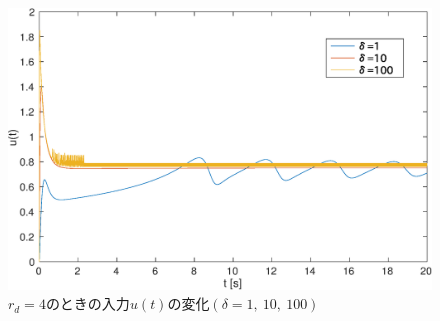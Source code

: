 \documentclass[a4paper,12pt]{jarticle}
\begin{document}
\begin{figure}[H]
 \begin{center}
  \includegraphics[scale=0.5]{../figure/eps/input/1/u.eps}
  \caption{$ r_d = 4 $のときの入力$ u(t) $の変化$(\delta = 1, ~ 10, ~ 100 )$}
  \label{u1}
 \end{center}
\end{figure}
\end{document}
